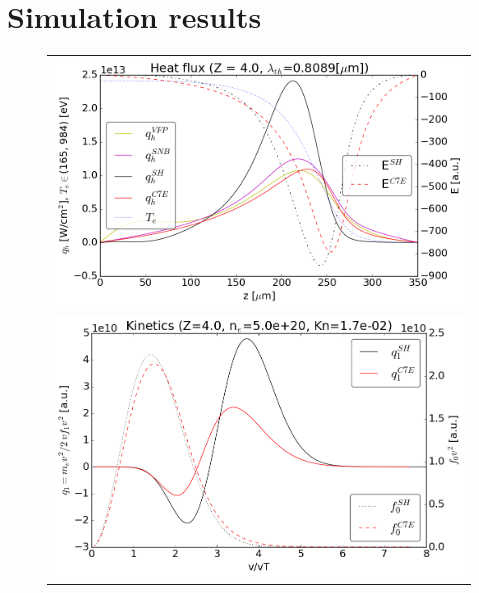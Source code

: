 \documentclass[preprint,12pt]{elsarticle}
\begin{document}
\section{Simulation results}\label{sec:results}
\begin{figure}[tbh]
  \begin{center}
    \begin{tabular}{c}
      \includegraphics[width=1.0\textwidth]{../VFPdata/C7_heatflux_6ps.png} \\ 
      \includegraphics[width=1.0\textwidth]{../VFPdata/C7_kinetics_6ps.png}
    \end{tabular}
  \caption{
  }
  \end{center}
  \label{fig:AWBScorrection_f1}
\end{figure}
\end{document}
